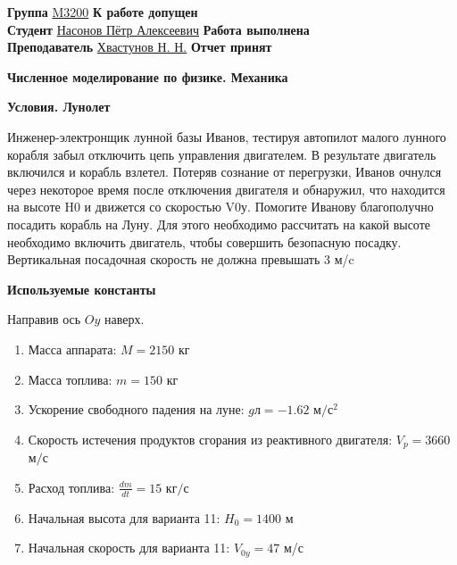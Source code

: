 \documentclass[12pt]{article}
\begin{document}
    \vspace*{2\baselineskip}

    \thispagestyle{fancy}

    \noindent
    \textbf{Группа} \underline{M3200} \hfill \textbf{К работе допущен} \underline{\hspace{4cm}} \\[0.5cm]
    \textbf{Студент} \underline{Насонов Пётр Алексеевич} \hfill \textbf{Работа выполнена} \underline{\hspace{4cm}} \\[0.5cm]
    \textbf{Преподаватель} \underline{Хвастунов Н. Н.} \hfill \textbf{Отчет принят} \underline{\hspace{4.85cm}} \\


    \begin{center}
    {\huge \textbf{Численное моделирование по физике. Механика}}

        \smallvspace

    \end{center}

    \begin{center}
        {\large \textbf{Условия. Лунолет}} \\
    \end{center}

    Инженер-электронщик лунной базы Иванов, тестируя автопилот малого лунного корабля
    забыл отключить цепь управления двигателем. В результате двигатель включился и корабль
    взлетел. Потеряв сознание от перегрузки, Иванов очнулся через некоторое время после
    отключения двигателя и обнаружил, что находится на высоте H0 и движется со скоростью
    V0у.
    Помогите Иванову благополучно посадить корабль на Луну. Для этого необходимо
    рассчитать на какой высоте необходимо включить двигатель, чтобы совершить безопасную
    посадку. Вертикальная посадочная скорость не должна превышать 3 м/c

    \large \textbf{Используемые константы} \normalsize

    Направив ось $Oy$ наверх.

    \normalsize
    \begin{enumerate}
        \item Масса аппарата: $M = 2150$ кг
        \item Масса топлива: $m = 150$ кг
        \item Ускорение свободного падения на луне: $g$л$ = -1.62$ $\text{м}/\text{с}^2$
        \item Скорость истечения продуктов сгорания из реактивного двигателя: $V_{p} = 3660$ $\text{м}/\text{с}$
        \item Расход топлива: $\frac{dm}{dt} = 15$ $\text{кг}/\text{с}$ 
        \item Начальная высота для варианта 11: $H_0 = 1400$ м
        \item Начальная скорость для варианта 11: $V_{0y} = 47$ м/с
    \end{enumerate}
    
\end{document}
